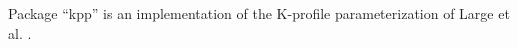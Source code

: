 
Package ``kpp'' is an implementation of the K-profile parameterization of
Large et al. \cite{lar94}.
